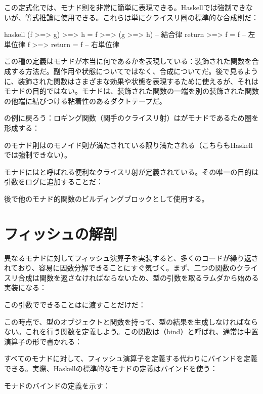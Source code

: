 この定式化では、モナド則を非常に簡単に表現できる。Haskellでは強制できないが、等式推論に使用できる。これらは単にクライスリ圏の標準的な合成則だ：

\begin{snip}{haskell}
(f >=> g) >=> h = f >=> (g >=> h) -- 結合律
return >=> f = f                  -- 左単位律
f >=> return = f                  -- 右単位律
\end{snip}
この種の定義はモナドが本当に何であるかを表現している：装飾された関数を合成する方法だ。副作用や状態についてではなく、合成についてだ。後で見るように、装飾された関数はさまざまな効果や状態を表現するために使えるが、それはモナドの目的ではない。モナドは、装飾された関数の一端を別の装飾された関数の他端に結びつける粘着性のあるダクトテープだ。

の例に戻ろう：ロギング関数（関手のクライスリ射）はがモナドであるため圏を形成する：

のモナド則はのモノイド則が満たされている限り満たされる（こちらもHaskellでは強制できない）。

モナドにはと呼ばれる便利なクライスリ射が定義されている。その唯一の目的は引数をログに追加することだ：

後で他のモナド的関数のビルディングブロックとして使用する。

\section{フィッシュの解剖}

異なるモナドに対してフィッシュ演算子を実装すると、多くのコードが繰り返されており、容易に因数分解できることにすぐ気づく。まず、二つの関数のクライスリ合成は関数を返さなければならないため、型の引数を取るラムダから始める実装になる：

この引数でできることはに渡すことだけだ：

この時点で、型のオブジェクトと関数を持って、型の結果を生成しなければならない。これを行う関数を定義しよう。この関数は（bind）と呼ばれ、通常は中置演算子の形で書かれる：

すべてのモナドに対して、フィッシュ演算子を定義する代わりにバインドを定義できる。実際、Haskellの標準的なモナドの定義はバインドを使う：

モナドのバインドの定義を示す：

